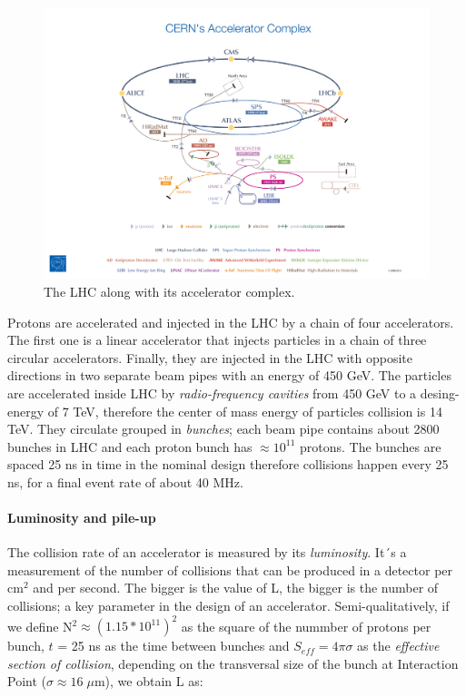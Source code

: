 \begin{figure}
    \centering
    \includegraphics[width=\columnwidth]{gfx/ch1/CERN's-accelerator-complex2013.jpg}
    \caption[The LHC]{The LHC along with its accelerator complex.}
    \label{fig:cernacc}
\end{figure}

Protons are accelerated and injected in the LHC by a chain of four accelerators.
The first one is a linear accelerator that injects particles in a chain of three circular
accelerators. Finally, they are injected in the LHC with opposite directions in
two separate beam pipes with an energy of 450 GeV. The particles are accelerated
inside LHC by \emph{radio-frequency cavities} from 450 GeV to a desing-energy of 7 TeV, therefore
the center of mass energy of particles collision is 14 TeV. They circulate
grouped in \emph{bunches}; each beam pipe contains about 2800 bunches in LHC and each
proton bunch has $\approx 10^{11}$ protons. The bunches are spaced 25 ns in time in the nominal
design therefore collisions happen every 25 ns, for a final event rate of about 40 MHz.

\paragraph{Luminosity and pile-up}

The collision rate of an accelerator is measured by its \emph{luminosity}. It´s a measurement of the number of collisions that can be produced in a detector per cm$^{2}$ and per second. The bigger is the value of L, the bigger is the number of collisions; a key parameter in the design of an accelerator.
Semi-qualitatively, if we define N$^2 \approx (1.15*10^{11})^2$ as the square of the nummber of protons per bunch, $t$ = 25 ns as the time between bunches and $S_{eff} = 4\pi\sigma$ as the \emph{effective section of collision}, depending on the transversal size of the bunch at Interaction Point ($\sigma \approx 16 \; \mu$m), we obtain L as:


